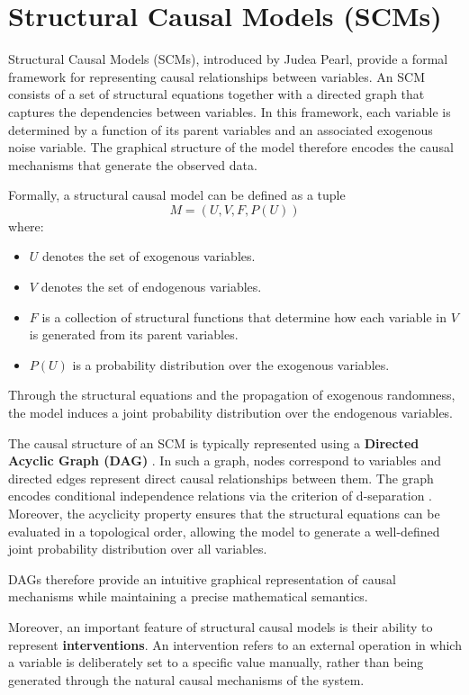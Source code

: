\documentclass[a4paper]{report}
\begin{document}
\section{Structural Causal Models (SCMs)}
Structural Causal Models (SCMs), introduced by Judea Pearl\cite{pearl2009causality}, provide a formal framework for representing causal relationships between variables. An SCM consists of a set of structural equations together with a directed graph that captures the dependencies between variables. In this framework, each variable is determined by a function of its parent variables and an associated exogenous noise variable. The graphical structure of the model therefore encodes the causal mechanisms that generate the observed data.

Formally, a structural causal model can be defined as a tuple
\[
M = (U, V, F, P(U))
\]
where:

\begin{itemize}
\item $U$ denotes the set of exogenous variables.
\item $V$ denotes the set of endogenous variables.
\item $F$ is a collection of structural functions that determine how each variable in $V$ is generated from its parent variables.
\item $P(U)$ is a probability distribution over the exogenous variables.
\end{itemize}

Through the structural equations and the propagation of exogenous randomness, the model induces a joint probability distribution over the endogenous variables.

The causal structure of an SCM is typically represented using a 
\textbf{Directed Acyclic Graph (DAG)} . In such a graph, nodes correspond to variables and directed edges represent direct causal relationships between them. The graph encodes conditional independence relations via the criterion of d-separation \cite{geiger1990dseparation}. Moreover, the acyclicity property ensures that the structural equations can be evaluated in a topological order, allowing the model to generate a well-defined joint probability distribution over all variables.

DAGs therefore provide an intuitive graphical representation of causal mechanisms while maintaining a precise mathematical semantics.

Moreover, an important feature of structural causal models is their ability to represent \textbf{interventions}. An intervention refers to an external operation in which a variable is deliberately set to a specific value manually, rather than being generated through the natural causal mechanisms of the system.
\end{document}
